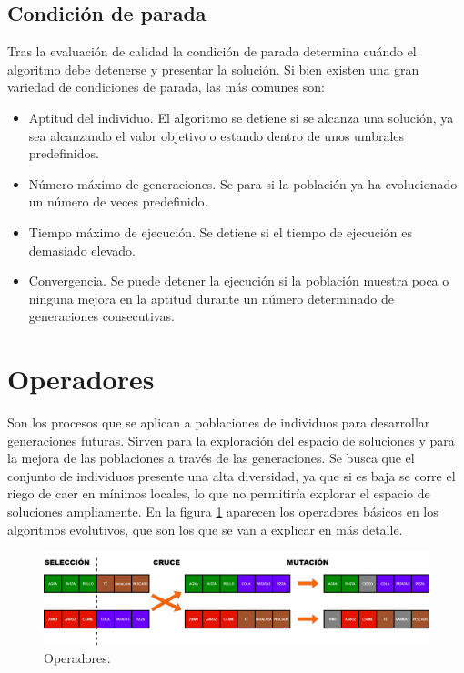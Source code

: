 \subsection{Condición de parada}

Tras la evaluación de calidad la condición de parada determina cuándo el algoritmo debe detenerse y presentar la solución. Si bien existen una gran variedad de condiciones de parada, las más comunes son:

\begin{itemize}
  \item Aptitud del individuo. El algoritmo se detiene si se alcanza una solución, ya sea alcanzando el valor objetivo o estando dentro de unos umbrales predefinidos.
  \item Número máximo de generaciones. Se para si la población ya ha evolucionado un número de veces predefinido.
  \item Tiempo máximo de ejecución. Se detiene si el tiempo de ejecución es demasiado elevado.
  \item Convergencia. Se puede detener la ejecución si la población muestra poca o ninguna mejora en la aptitud durante un número determinado de generaciones consecutivas.
\end{itemize}
\newpage
\section{Operadores}

Son los procesos que se aplican a poblaciones de individuos para desarrollar generaciones futuras. Sirven para la exploración del espacio de soluciones y para la mejora de las poblaciones a través de las generaciones. Se busca que el conjunto de individuos presente una alta diversidad, ya que si es baja se corre el riego de caer en mínimos locales, lo que no permitiría explorar el espacio de soluciones ampliamente. En la figura \ref{fig:operadores} aparecen los operadores básicos en los algoritmos evolutivos, que son los que se van a explicar en más detalle.

\begin{figure}[H]
  \centering
  \includegraphics[width=1\textwidth]{figures/operadores.png}
  \caption{Operadores.}
  \label{fig:operadores}
\end{figure}


